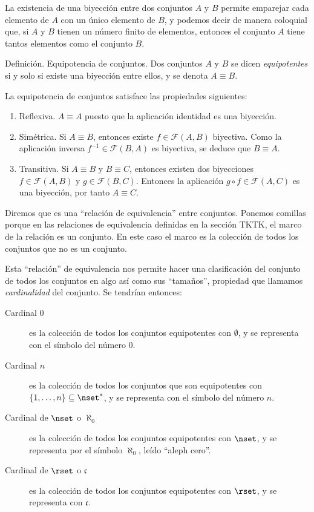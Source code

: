 

La existencia de una biyección entre dos conjuntos $A$ y $B$ permite
emparejar cada elemento de $A$ con un único elemento de $B$, y podemos decir
de manera coloquial que, si $A$ y $B$ tienen un número finito de elementos,
entonces el conjunto $A$ tiene tantos elementos como el conjunto $B$.

Definición. Equipotencia de conjuntos. Dos conjuntos $A$ y $B$ se dicen
\emph{equipotentes} si y solo si existe una biyección entre ellos, y se
denota $A \equiv B$.

La equipotencia de conjuntos satisface las propiedades siguientes:

\begin{enumerate}
  \item Reflexiva. $A \equiv A$ puesto que la aplicación identidad es una
    biyección.

  \item Simétrica. Si $A \equiv B$, entonces existe $f \in \mathcal{F}(A,
    B)$ biyectiva. Como la aplicación inversa $f^{-1} \in \mathcal{F}(B, A)$
    es biyectiva, se deduce que $B \equiv A$.

  \item Transitiva. Si $A \equiv B$ y $B \equiv C$, entonces existen dos
    biyecciones $f \in \mathcal{F}(A, B)$ y $g \in \mathcal{F}(B, C)$.
    Entonces la aplicación $g \circ f \in \mathcal{F}(A, C)$ es una
    biyección, por tanto $A \equiv C$.
\end{enumerate}

Diremos que es una ``relación de equivalencia'' entre conjuntos. Ponemos
comillas porque en las relaciones de equivalencia definidas en la sección
TKTK, el marco de la relación es un conjunto. En este caso el marco es la
colección de todos los conjuntos que no es un conjunto.

Esta ``relación'' de equivalencia nos permite hacer una clasificación del
conjunto de todos los conjuntos en algo así como sus ``tamaños'', propiedad
que llamamos \emph{cardinalidad} del conjunto. Se tendrían entonces:

\begin{description}
  \item[Cardinal 0] es la colección de todos los conjuntos equipotentes con
    $\emptyset$, y se representa con el símbolo del número $0$.

  \item [Cardinal $n$] es la colección de todos los conjuntos que son
    equipotentes con $\{1, \ldots, n\} \subseteq \nset^*$, y se representa
    con el símbolo del número $n$.

  \item [Cardinal de $\nset$ o $\aleph_0$] es la colección de todos los
    conjuntos equipotentes con $\nset$, y se representa por el símbolo
    $\aleph_0$, leído ``aleph cero''.\footnotemark

  \item [Cardinal de $\rset$ o $\mathfrak{c}$] es la colección de todos los
    conjuntos equipotentes con $\rset$, y se representa con
    $\mathfrak{c}$.\footnotemark
\end{description}

